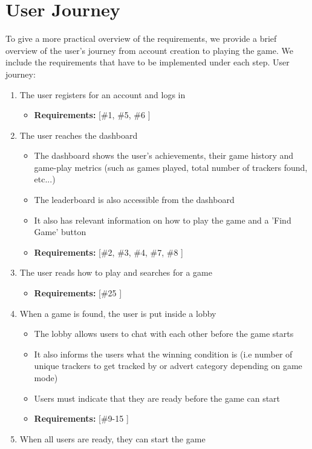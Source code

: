 \documentclass{l4proj}
\begin{document}
\section{User Journey}
To give a more practical overview of the requirements, we provide a brief overview of the user's journey from account creation to playing the game. We include the requirements that have to be implemented under each step.
User journey:
\begin{enumerate}
    \item The user registers for an account and logs in
    \begin{itemize}
 	\item \textbf{Requirements: } [\#1, \#5, \#6 ]
    \end{itemize}
    \item The user reaches the dashboard
    \begin{itemize}
 	\item The dashboard shows the user's achievements, their game history and game-play metrics (such as games played, total number of trackers found, etc...)
           \item The leaderboard is also accessible from the dashboard
	\item It also has relevant information on how to play the game and a 'Find Game' button 
 	\item \textbf{Requirements: } [\#2, \#3, \#4, \#7, \#8 ]
    \end{itemize}
    \item The user reads how to play and searches for a game
    \begin{itemize}
 	\item \textbf{Requirements: } [\#25 ]
    \end{itemize}
    \item When a game is found, the user is put inside a lobby
    \begin{itemize}
 	\item The lobby allows users to chat with each other before the game starts
           \item It also informs the users what the winning condition is (i.e number of unique trackers to get tracked by or advert category depending on game mode)
           \item Users must indicate that they are ready before the game can start
 	\item \textbf{Requirements: } [\#9-15 ]
    \end{itemize}
    \item When all users are ready, they can start the game

\end{enumerate}
\end{document}
